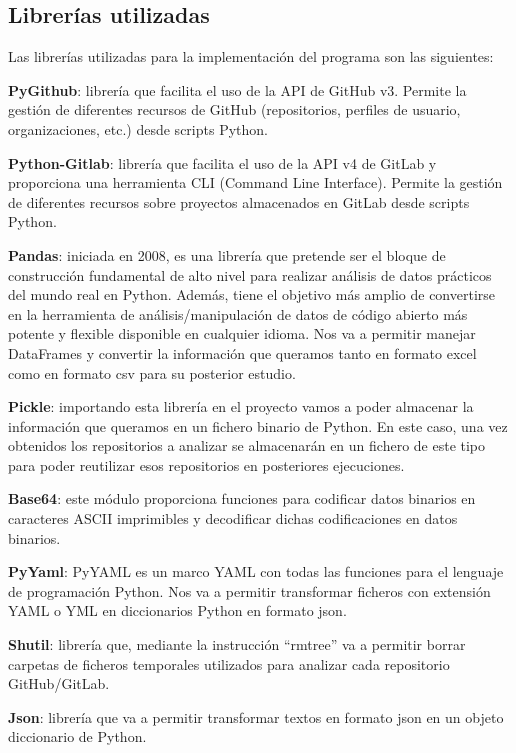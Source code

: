 \subsection{Librerías utilizadas}
Las librerías utilizadas para la implementación del programa son las siguientes:
\begin{compactitem}
    \item \textbf{PyGithub}: librería que facilita el uso de la API de GitHub v3. Permite la gestión de diferentes recursos de GitHub (repositorios, perfiles de usuario, organizaciones, etc.) desde scripts Python.
    \item \textbf{Python-Gitlab}: librería que facilita el uso de la API v4 de GitLab y proporciona una herramienta CLI (Command Line Interface). Permite la gestión de diferentes recursos sobre proyectos almacenados en GitLab desde scripts Python.
    \item \textbf{Pandas}: iniciada en 2008, es una librería que pretende ser el bloque de construcción fundamental de alto nivel para realizar análisis de datos prácticos del mundo real en Python. Además, tiene el objetivo más amplio de convertirse en la herramienta de análisis/manipulación de datos de código abierto más potente y flexible disponible en cualquier idioma. Nos va a permitir manejar DataFrames y convertir la información que queramos tanto en formato excel como en formato csv para su posterior estudio.
    \item \textbf{Pickle}: importando esta librería en el proyecto vamos a poder almacenar la información que queramos en un fichero binario de Python. En este caso, una vez obtenidos los repositorios a analizar se almacenarán en un fichero de este tipo para poder reutilizar esos repositorios en posteriores ejecuciones.
    \item \textbf{Base64}: este módulo proporciona funciones para codificar datos binarios en caracteres ASCII imprimibles y decodificar dichas codificaciones en datos binarios.
    \item \textbf{PyYaml}: PyYAML es un marco YAML con todas las funciones para el lenguaje de programación Python. Nos va a permitir transformar ficheros con extensión YAML o YML en diccionarios Python en formato json.
    \item \textbf{Shutil}: librería que, mediante la instrucción ``rmtree'' va a permitir borrar carpetas de ficheros temporales utilizados para analizar cada repositorio GitHub/GitLab.
    \item \textbf{Json}: librería que va a permitir transformar textos en formato json en un objeto diccionario de Python.
\end{compactitem}

